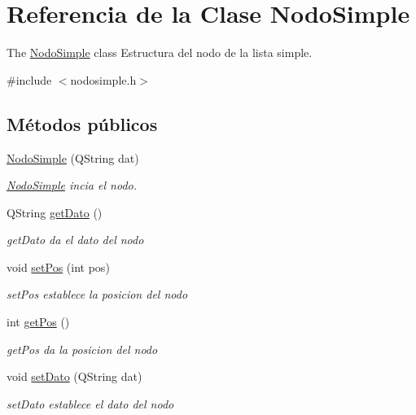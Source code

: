 \hypertarget{class_nodo_simple}{}\section{Referencia de la Clase Nodo\+Simple}
\label{class_nodo_simple}


The \mbox{\hyperlink{class_nodo_simple}{Nodo\+Simple}} class Estructura del nodo de la lista simple.  




{\ttfamily \#include $<$nodosimple.\+h$>$}

\subsection*{Métodos públicos}
\begin{DoxyCompactItemize}
\item 
\mbox{\hyperlink{class_nodo_simple_acde7a8d315007bd580fbff42eaa69c9c}{Nodo\+Simple}} (Q\+String dat)
\begin{DoxyCompactList}\small\item\em \mbox{\hyperlink{class_nodo_simple}{Nodo\+Simple}} incia el nodo. \end{DoxyCompactList}\item 
Q\+String \mbox{\hyperlink{class_nodo_simple_a8e2cf29c0b691d7c81a4a1f2c9414863}{get\+Dato}} ()
\begin{DoxyCompactList}\small\item\em get\+Dato da el dato del nodo \end{DoxyCompactList}\item 
void \mbox{\hyperlink{class_nodo_simple_a455c9a0f62ba752d4e29e54fd588cdd1}{set\+Pos}} (int pos)
\begin{DoxyCompactList}\small\item\em set\+Pos establece la posicion del nodo \end{DoxyCompactList}\item 
int \mbox{\hyperlink{class_nodo_simple_a6808405a250b6a7b097d34767dfa9b30}{get\+Pos}} ()
\begin{DoxyCompactList}\small\item\em get\+Pos da la posicion del nodo \end{DoxyCompactList}\item 
void \mbox{\hyperlink{class_nodo_simple_ab32eeae9ba44f0464a5d45c69602cd11}{set\+Dato}} (Q\+String dat)
\begin{DoxyCompactList}\small\item\em set\+Dato establece el dato del nodo \end{DoxyCompactList}\end{DoxyCompactItemize}
